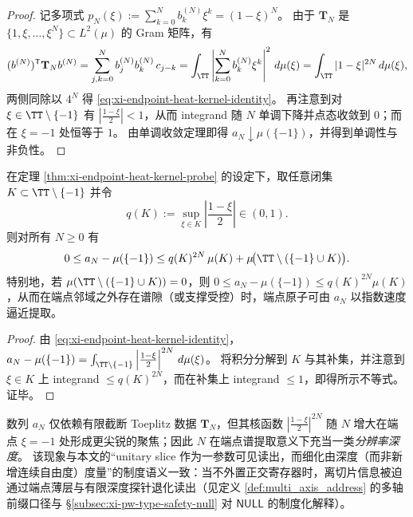 \begin{proof}
记多项式 \(p_N(\xi):=\sum_{k=0}^{N}b^{(N)}_k\xi^k=(1-\xi)^N\)。
由于 \(\mathbf{T}_N\) 是 \(\{1,\xi,\dots,\xi^N\}\subset L^2(\mu)\) 的 Gram 矩阵，有
\[
(b^{(N)})^{\mathsf T}\mathbf{T}_N b^{(N)}
=\sum_{j,k=0}^{N}b^{(N)}_j b^{(N)}_k\,c_{j-k}
=\int_{\TT}\left|\sum_{k=0}^{N}b^{(N)}_k\xi^k\right|^{2}\,d\mu(\xi)
=\int_{\TT}|1-\xi|^{2N}\,d\mu(\xi),
\]
两侧同除以 \(4^N\) 得 \eqref{eq:xi-endpoint-heat-kernel-identity}。
再注意到对 \(\xi\in\TT\setminus\{-1\}\) 有 \(\left|\frac{1-\xi}{2}\right|<1\)，从而 integrand 随 \(N\) 单调下降并点态收敛到 \(0\)；而在 \(\xi=-1\) 处恒等于 \(1\)。
由单调收敛定理即得 \(a_N\downarrow \mu(\{-1\})\)，并得到单调性与非负性。
\end{proof}

\begin{corollary}[端点原子提取的指数型误差界]\label{cor:xi-endpoint-heat-kernel-exp-error}
在定理 \ref{thm:xi-endpoint-heat-kernel-probe} 的设定下，取任意闭集 \(K\subset\TT\setminus\{-1\}\) 并令
\[
q(K):=\sup_{\xi\in K}\left|\frac{1-\xi}{2}\right|\in(0,1).
\]
则对所有 \(N\ge 0\) 有
\[
0\le a_N-\mu(\{-1\})
\le q(K)^{2N}\,\mu(K)+\mu\!\bigl(\TT\setminus(\{-1\}\cup K)\bigr).
\]
特别地，若 \(\mu(\TT\setminus(\{-1\}\cup K))=0\)，则
\(
0\le a_N-\mu(\{-1\})\le q(K)^{2N}\mu(K)
\)，从而在端点邻域之外存在谱隙（或支撑受控）时，端点原子可由 \(a_N\) 以指数速度逼近提取。
\end{corollary}

\begin{proof}
由 \eqref{eq:xi-endpoint-heat-kernel-identity}，
\(
a_N-\mu(\{-1\})=\int_{\TT\setminus\{-1\}}\left|\frac{1-\xi}{2}\right|^{2N}\,d\mu(\xi)
\)。
将积分分解到 \(K\) 与其补集，并注意到 \(\xi\in K\) 上 integrand \(\le q(K)^{2N}\)，而在补集上 integrand \(\le 1\)，即得所示不等式。证毕。
\end{proof}

\begin{remark}[分辨率深度与一参数读出]\label{rem:xi-endpoint-probe-resolution-depth}
数列 \(a_N\) 仅依赖有限截断 Toeplitz 数据 \(\mathbf{T}_N\)，但其核函数 \(\left|\frac{1-\xi}{2}\right|^{2N}\) 随 \(N\) 增大在端点 \(\xi=-1\) 处形成更尖锐的聚焦；因此 \(N\) 在端点谱提取意义下充当一类\emph{分辨率深度}。
该现象与本文的“unitary slice 作为一参数可见读出，而细化由深度（而非新增连续自由度）度量”的制度语义一致：当不外置正交寄存器时，离切片信息被迫通过端点薄层与有限深度探针退化读出（见定义 \ref{def:multi_axis_address} 的多轴前缀口径与 \S\ref{subsec:xi-pw-type-safety-null} 对 \(\mathsf{NULL}\) 的制度化解释）。
\end{remark}

